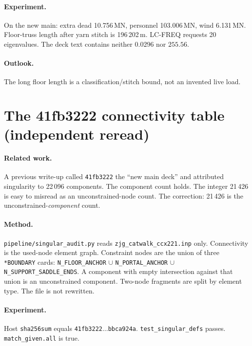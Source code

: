 \documentclass[11pt,a4paper]{article}
\begin{document}
\paragraph{Experiment.}
On the new main: extra dead 10.756\,MN, personnel 103.006\,MN, wind
6.131\,MN. Floor-truss length after yarn stitch is 196\,202\,m. LC-FREQ
requests 20 eigenvalues. The deck text contains neither \(0.0296\) nor
\(255.56\).

\paragraph{Outlook.}
The long floor length is a classification/stitch bound, not an invented live
load.

\section{The 41fb3222 connectivity table (independent reread)}
\label{sec:defs}

\paragraph{Related work.}
A previous write-up called \texttt{41fb3222} the ``new main deck'' and
attributed singularity to 22\,096 components. The component count holds. The
integer 21\,426 is easy to misread as an unconstrained-node count. The
correction: 21\,426 is the unconstrained-\emph{component} count.

\paragraph{Method.}
\texttt{pipeline/singular\_audit.py} reads \texttt{zjg\_catwalk\_ccx221.inp}
only. Connectivity is the used-node element graph. Constraint nodes are the
union of three \texttt{*BOUNDARY} cards:
\texttt{N\_FLOOR\_ANCHOR} \(\cup\) \texttt{N\_PORTAL\_ANCHOR} \(\cup\)
\texttt{N\_SUPPORT\_SADDLE\_ENDS}. A component with empty intersection
against that union is an unconstrained component. Two-node fragments are
split by element type. The file is not rewritten.

\paragraph{Experiment.}
Host \texttt{sha256sum} equals \texttt{41fb3222\(\ldots\)bbca924a}.
\texttt{test\_singular\_defs} passes. \texttt{match\_given.all} is true.
\end{document}

